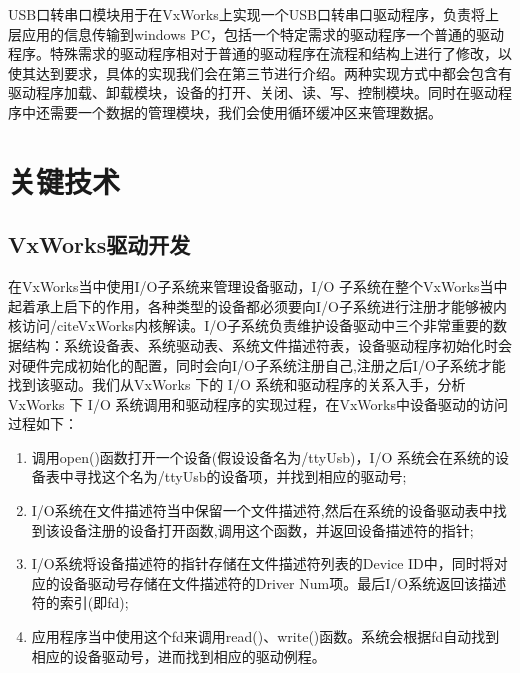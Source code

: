 	USB口转串口模块用于在VxWorks上实现一个USB口转串口驱动程序，负责将上层应用的信息传输到windows PC，包括一个特定需求的驱动程序一个普通的驱动程序。特殊需求的驱动程序相对于普通的驱动程序在流程和结构上进行了修改，以使其达到要求，具体的实现我们会在第三节进行介绍。两种实现方式中都会包含有驱动程序加载、卸载模块，设备的打开、关闭、读、写、控制模块。同时在驱动程序中还需要一个数据的管理模块，我们会使用循环缓冲区来管理数据。


\section{关键技术}

\subsection{VxWorks驱动开发}
	
	在VxWorks当中使用I/O子系统来管理设备驱动，I/O 子系统在整个VxWorks当中起着承上启下的作用，各种类型的设备都必须要向I/O子系统进行注册才能够被内核访问/cite{VxWorks内核解读}\cite{曹桂平2011VxWorks}。I/O子系统负责维护设备驱动中三个非常重要的数据结构：系统设备表、系统驱动表、系统文件描述符表，设备驱动程序初始化时会对硬件完成初始化的配置，同时会向I/O子系统注册自己,注册之后I/O子系统才能找到该驱动。我们从VxWorks 下的 I/O 系统和驱动程序的关系入手，分析 VxWorks 下 I/O 系统调用和驱动程序的实现过程，在VxWorks中设备驱动的访问过程如下：
\begin{enumerate}
\item 调用open()函数打开一个设备(假设设备名为/ttyUsb)，I/O 系统会在系统的设备表中寻找这个名为/ttyUsb的设备项，并找到相应的驱动号; 
\item I/O系统在文件描述符当中保留一个文件描述符,然后在系统的设备驱动表中找到该设备注册的设备打开函数,调用这个函数，并返回设备描述符的指针;
\item I/O系统将设备描述符的指针存储在文件描述符列表的Device ID中，同时将对应的设备驱动号存储在文件描述符的Driver Num项。最后I/O系统返回该描述符的索引(即fd);
\item 应用程序当中使用这个fd来调用read()、write()函数。系统会根据fd自动找到相应的设备驱动号，进而找到相应的驱动例程\cite{解月江2004VxWorks设备驱动技术研究}。 
\end{enumerate}

